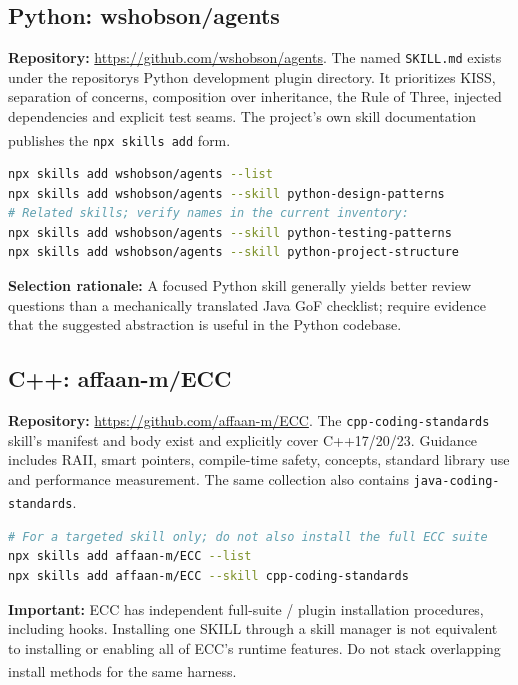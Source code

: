 \documentclass[11pt,letterpaper]{article}
\newcommand{\src}[1]{\textsuperscript{\textcolor{teal}{\cite{#1}}}}
\begin{document}
\subsection{Python: wshobson/agents}
\textbf{Repository:} \url{https://github.com/wshobson/agents}. The named \texttt{SKILL.md} exists under the repository\textquotesingle{}s Python development plugin directory. It prioritizes KISS, separation of concerns, composition over inheritance, the Rule of Three, injected dependencies and explicit test seams. The project's own skill documentation publishes the \texttt{npx skills add} form.\src{wshobson,wshobsonfile}
\begin{lstlisting}[language=bash]
npx skills add wshobson/agents --list
npx skills add wshobson/agents --skill python-design-patterns
# Related skills; verify names in the current inventory:
npx skills add wshobson/agents --skill python-testing-patterns
npx skills add wshobson/agents --skill python-project-structure
\end{lstlisting}
\textbf{Selection rationale:} A focused Python skill generally yields better review questions than a mechanically translated Java GoF checklist; require evidence that the suggested abstraction is useful in the Python codebase.

\subsection{C++: affaan-m/ECC}
\textbf{Repository:} \url{https://github.com/affaan-m/ECC}. The \texttt{cpp-coding-standards} skill's manifest and body exist and explicitly cover C++17/20/23. Guidance includes RAII, smart pointers, compile-time safety, concepts, standard library use and performance measurement. The same collection also contains \texttt{java-coding-standards}.\src{cppskill,javastandards}
\begin{lstlisting}[language=bash]
# For a targeted skill only; do not also install the full ECC suite
npx skills add affaan-m/ECC --list
npx skills add affaan-m/ECC --skill cpp-coding-standards
\end{lstlisting}
\textbf{Important:} ECC has independent full-suite / plugin installation procedures, including hooks. Installing one SKILL through a skill manager is not equivalent to installing or enabling all of ECC's runtime features. Do not stack overlapping install methods for the same harness.\src{ecc}
\end{document}
